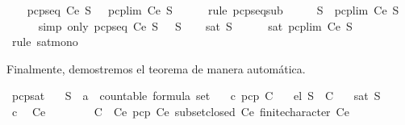 \begin{isabellebody}
\ \ \isamarkupfalse%
\ {\isachardoublequoteopen}pcp{\isacharunderscore}seq\ Ce\ S\ {}\ {\isasymsubseteq}\ pcp{\isacharunderscore}lim\ Ce\ S{\isachardoublequoteclose}\isanewline
\ \ \ \ \isamarkupfalse%
\ {\isacharparenleft}rule\ pcp{\isacharunderscore}seq{\isacharunderscore}sub{\isacharparenright}\isanewline
\ \ \isamarkupfalse%
\ \isamarkupfalse%
\ {\isachardoublequoteopen}S\ {\isasymsubseteq}\ pcp{\isacharunderscore}lim\ Ce\ S{\isachardoublequoteclose}\isanewline
\ \ \ \ \isamarkupfalse%
\ {\isacharparenleft}simp\ only{\isacharcolon}\ {\isacartoucheopen}pcp{\isacharunderscore}seq\ Ce\ S\ {}\ {\isacharequal}\ S{\isacartoucheclose}{\isacharparenright}\isanewline
\ \ \isamarkupfalse%
\ {\isachardoublequoteopen}sat\ S{\isachardoublequoteclose}\isanewline
\ \ \ \ \isamarkupfalse%
\ {\isacartoucheopen}sat\ {\isacharparenleft}pcp{\isacharunderscore}lim\ Ce\ S{\isacharparenright}{\isacartoucheclose}\ \isamarkupfalse%
\ {\isacharparenleft}rule\ sat{\isacharunderscore}mono{\isacharparenright}\isanewline
{}\isamarkupfalse%
%
\endisatagproof
{\isafoldproof}%
%
\isadelimproof
%
\endisadelimproof
%
\begin{isamarkuptext}%
Finalmente, demostremos el teorema de manera automática.%
\end{isamarkuptext}\isamarkuptrue%
\isamarkupfalse%
\ pcp{\isacharunderscore}sat{\isacharcolon}\isanewline
\ \ \ S\ {\isacharcolon}{\isacharcolon}\ {\isachardoublequoteopen}{\isacharprime}a\ {\isacharcolon}{\isacharcolon}\ countable\ formula\ set{\isachardoublequoteclose}\isanewline
\ \ \ c{\isacharcolon}\ {\isachardoublequoteopen}pcp\ C{\isachardoublequoteclose}\isanewline
\ \ \ el{\isacharcolon}\ {\isachardoublequoteopen}S\ {\isasymin}\ C{\isachardoublequoteclose}\isanewline
\ \ \ {\isachardoublequoteopen}sat\ S{\isachardoublequoteclose}\isanewline
%
\isadelimproof
%
\endisadelimproof
%
\isatagproof
{}\isamarkupfalse%
\ {\isacharminus}\isanewline
\ \ \isamarkupfalse%
\ c\ \isamarkupfalse%
\ Ce\ \ \isanewline
\ \ \ \ \ \ {\isachardoublequoteopen}C\ {\isasymsubseteq}\ Ce{\isachardoublequoteclose}\ {\isachardoublequoteopen}pcp\ Ce{\isachardoublequoteclose}\ {\isachardoublequoteopen}subset{\isacharunderscore}closed\ Ce{\isachardoublequoteclose}\ {\isachardoublequoteopen}finite{\isacharunderscore}character\ Ce{\isachardoublequoteclose}\ \isanewline

\end{isabellebody}
